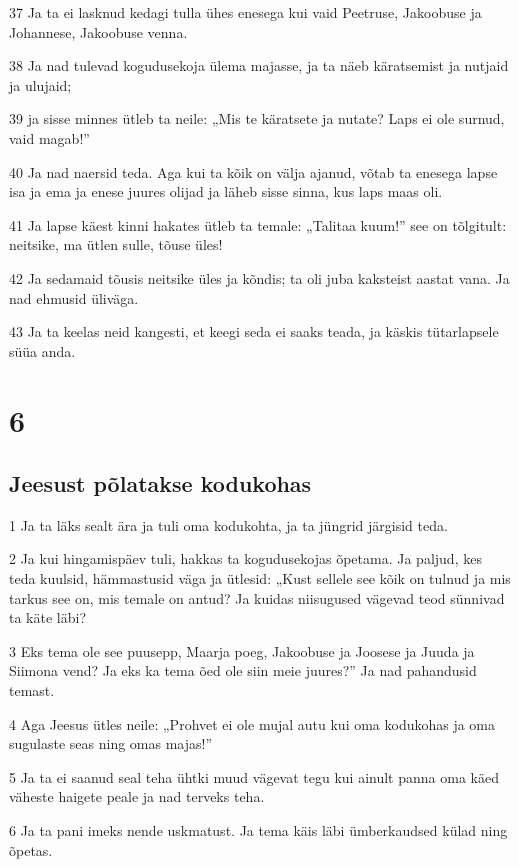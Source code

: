 \par 37 Ja ta ei lasknud kedagi tulla ühes enesega kui vaid Peetruse, Jakoobuse ja Johannese, Jakoobuse venna.
\par 38 Ja nad tulevad kogudusekoja ülema majasse, ja ta näeb käratsemist ja nutjaid ja ulujaid;
\par 39 ja sisse minnes ütleb ta neile: „Mis te käratsete ja nutate? Laps ei ole surnud, vaid magab!”
\par 40 Ja nad naersid teda. Aga kui ta kõik on välja ajanud, võtab ta enesega lapse isa ja ema ja enese juures olijad ja läheb sisse sinna, kus laps maas oli.
\par 41 Ja lapse käest kinni hakates ütleb ta temale: „Talitaa kuum!” see on tõlgitult: neitsike, ma ütlen sulle, tõuse üles!
\par 42 Ja sedamaid tõusis neitsike üles ja kõndis; ta oli juba kaksteist aastat vana. Ja nad ehmusid üliväga.
\par 43 Ja ta keelas neid kangesti, et keegi seda ei saaks teada, ja käskis tütarlapsele süüa anda.


\chapter{6}

\section*{Jeesust põlatakse kodukohas}

\par 1 Ja ta läks sealt ära ja tuli oma kodukohta, ja ta jüngrid järgisid teda.
\par 2 Ja kui hingamispäev tuli, hakkas ta kogudusekojas õpetama. Ja paljud, kes teda kuulsid, hämmastusid väga ja ütlesid: „Kust sellele see kõik on tulnud ja mis tarkus see on, mis temale on antud? Ja kuidas niisugused vägevad teod sünnivad ta käte läbi?
\par 3 Eks tema ole see puusepp, Maarja poeg, Jakoobuse ja Joosese ja Juuda ja Siimona vend? Ja eks ka tema õed ole siin meie juures?” Ja nad pahandusid temast.
\par 4 Aga Jeesus ütles neile: „Prohvet ei ole mujal autu kui oma kodukohas ja oma sugulaste seas ning omas majas!”
\par 5 Ja ta ei saanud seal teha ühtki muud vägevat tegu kui ainult panna oma käed väheste haigete peale ja nad terveks teha.
\par 6 Ja ta pani imeks nende uskmatust. Ja tema käis läbi ümberkaudsed külad ning õpetas.

